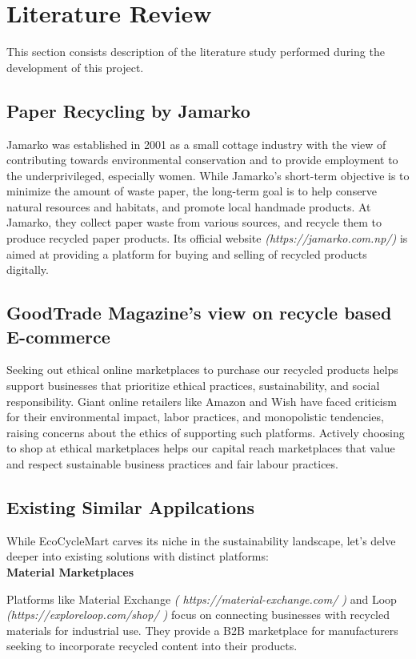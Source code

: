 \documentclass[12pt, a4paper, oneside]{article}
\begin{document}
\section{Literature Review}
This section consists description of the literature study performed during the development of this project.

\subsection{Paper Recycling by Jamarko}
Jamarko was established in 2001 as a small cottage industry with the view of contributing towards environmental conservation and to provide employment to the underprivileged, especially women. While Jamarko’s short-term objective is to minimize the amount of waste paper, the long-term goal is to help conserve natural resources and habitats, and promote local handmade products.
At Jamarko, they collect paper waste from various sources, and recycle them to produce recycled paper products. Its official website \textit{(https://jamarko.com.np/)} is aimed at providing a platform for buying and selling of recycled products
digitally.

\subsection{GoodTrade Magazine's view on recycle based E-commerce}
Seeking out ethical online marketplaces to purchase our recycled products helps support
businesses that prioritize ethical practices, sustainability, and social responsibility. Giant online
retailers like Amazon and Wish have faced criticism for their environmental impact, labor
practices, and monopolistic tendencies, raising concerns about the ethics of supporting such
platforms. Actively choosing to shop at ethical marketplaces helps our capital reach
marketplaces that value and respect sustainable business practices and fair labour practices. 

\pagebreak
\subsection{Existing Similar Appilcations}
While EcoCycleMart carves its niche in the sustainability landscape, let's delve deeper into existing solutions with distinct platforms:\\

\textbf{Material Marketplaces} 

Platforms like Material Exchange \textit{( https://material-exchange.com/ ) } and Loop \textit{(https://exploreloop.com/shop/ )} focus on connecting businesses with recycled materials for industrial use. They provide a B2B marketplace for manufacturers seeking to incorporate recycled content into their products.
\end{document}
